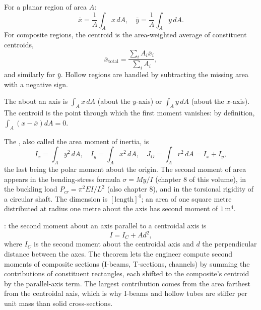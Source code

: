For a planar region of area $A$:
\[
\bar{x} = \frac{1}{A} \int_A x \, dA, \quad
\bar{y} = \frac{1}{A} \int_A y \, dA.
\]
For composite regions, the centroid is the area-weighted average
of constituent centroids,
\[
\bar{x}_{\text{total}} = \frac{\sum_i A_i \bar{x}_i}{\sum_i A_i},
\]
and similarly for $\bar{y}$. Hollow regions are handled by
subtracting the missing area with a negative sign.

The  about an axis is $\int_A x \,dA$
(about the $y$-axis) or $\int_A y \,dA$ (about the $x$-axis). The
centroid is the point through which the first moment vanishes: by
definition, $\int_A (x - \bar{x}) dA = 0$.

The , also called the area moment of
inertia, is
\[
I_x = \int_A y^2 \,dA, \quad I_y = \int_A x^2 \,dA, \quad
J_O = \int_A r^2 \,dA = I_x + I_y,
\]
the last being the polar moment about the origin. The second moment
of area appears in the bending-stress formula $\sigma = My/I$ (chapter
8 of this volume), in the buckling load $P_{cr} = \pi^2 EI / L^2$
(also chapter 8), and in the torsional rigidity of a circular shaft.
The dimension is $[\text{length}]^4$; an area of one square metre
distributed at radius one metre about the axis has second moment of
$1\,\si{\meter\tothe{4}}$.

: the second moment about an axis
parallel to a centroidal axis is
\[
I = I_C + A d^2,
\]
where $I_C$ is the second moment about the centroidal axis and $d$
the perpendicular distance between the axes. The theorem lets the
engineer compute second moments of composite sections (I-beams,
T-sections, channels) by summing the contributions of constituent
rectangles, each shifted to the composite's centroid by the
parallel-axis term. The largest contribution comes from the area
farthest from the centroidal axis, which is why I-beams and
hollow tubes are stiffer per unit mass than solid cross-sections.

